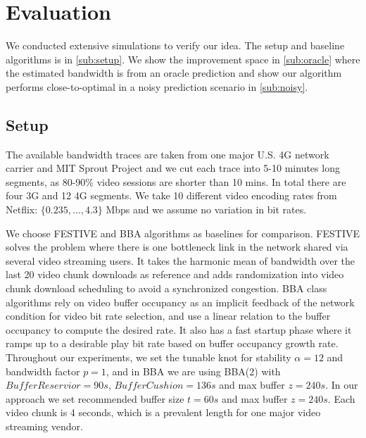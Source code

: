 
\section{Evaluation} \label{sec:evaluation}
We conducted extensive simulations to verify our idea. The setup and baseline algorithms is in \autoref{sub:setup}. We show the improvement space in \autoref{sub:oracle} where the estimated bandwidth is from an oracle prediction and show our algorithm performs close-to-optimal in a noisy prediction scenario in \autoref{sub:noisy}. 

\subsection{Setup} \label{sub:setup}
 The available bandwidth traces are taken from one major U.S. 4G network carrier and MIT Sprout Project\cite{Sprout} and we cut each trace into 5-10 minutes long segments, as 80-90\% video sessions are shorter than 10 mins\cite{ATTVIDEO}. In total there are four 3G and 12 4G segments. We take 10 different video encoding rates from Netflix: $\{0.235,\dots, 4.3\}$ Mbps and we assume no variation in bit rates. 

We choose FESTIVE \cite{Festive} and BBA \cite{BBA} algorithms as baselines for comparison. FESTIVE solves the problem where there is one bottleneck link in the network shared via several video streaming users. It takes the harmonic mean of bandwidth over the last 20 video chunk downloads as reference and adds randomization into video chunk download scheduling to avoid a synchronized congestion. BBA class algorithms rely on video buffer occupancy as an implicit feedback of the network condition for video bit rate selection, and use a linear relation to the buffer occupancy to compute the desired rate. It also has a fast startup phase where it ramps up to a desirable play bit rate based on buffer occupancy growth rate. Throughout our experiments, we set the tunable knot for stability $\alpha =12 $ and bandwidth factor $p=1$, and in BBA we are using BBA(2) with $BufferReservior=90s$, $BufferCushion=136s$ and max buffer $z=240s$. In our approach we set recommended buffer size $t=60s$ and max buffer $z=240s$. Each video chunk is 4 seconds, which is a prevalent length for one major video streaming vendor. 






